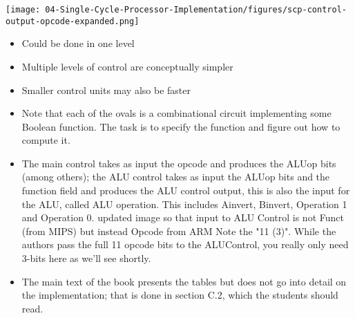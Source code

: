 \newpage
\begin{frame}[fragile]
\texttt{[image: 04-Single-Cycle-Processor-Implementation/figures/scp-control-output-opcode-expanded.png]}
\begin{itemize}
\item Could be done in one level
\item Multiple levels of control are conceptually simpler
\item Smaller control units may also be faster
\end{itemize}
\BNotes\ifnum{}
\begin{itemize}
\item
Note that each of the ovals is a combinational circuit implementing
some Boolean function. The task is to specify the function and figure
out how to compute it.
\item
The main control takes as input the
opcode and produces the ALUop bits (among others); the ALU control
takes as input the ALUop bits and the function field and produces the
ALU control output, this is also the input for the ALU, called ALU operation. 
This includes Ainvert, Binvert, Operation 1 and Operation 0. 
updated image so that input to ALU Control is not Funct (from MIPS) but instead Opcode from ARM
Note the "11 (3)".  While the authors pass the full 11 opcode bits to the ALUControl, you really only need 3-bits here as we'll see shortly.
\item
The main text of the book presents the tables but does not go into
detail on the implementation; that is done in section C.2, which the
students should read.
\end{itemize}
\fi\ENotes
\end{frame}

